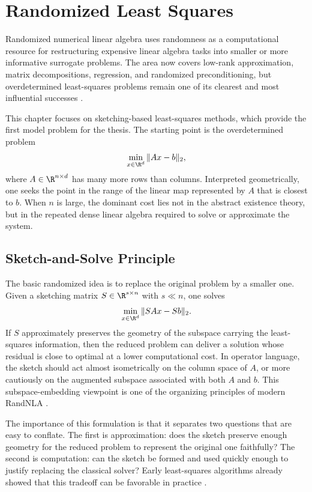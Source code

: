 \chapter{Randomized Least Squares} \label{ch:randls}

Randomized numerical linear algebra uses randomness as a computational resource for restructuring expensive linear algebra tasks into smaller or more informative surrogate problems. The area now covers low-rank approximation, matrix decompositions, regression, and randomized preconditioning, but overdetermined least-squares problems remain one of its clearest and most influential successes \cite{halko2011finding,martinsson2020randnla,woodruff2014sketching}.

This chapter focuses on sketching-based least-squares methods, which provide the
first model problem for the thesis. The starting point is the overdetermined problem
\[
	\min_{x \in \R^d} \|Ax-b\|_2,
\]
where \(A \in \R^{n \times d}\) has many more rows than columns. Interpreted geometrically, one seeks the point in the range of the linear map represented by \(A\) that is closest to \(b\). When \(n\) is large, the dominant cost lies not in the abstract existence theory, but in the repeated dense linear algebra required to solve or approximate the system.

\section{Sketch-and-Solve Principle}

The basic randomized idea is to replace the original problem by a smaller one. Given a sketching matrix \(S \in \R^{s \times n}\) with \(s \ll n\), one solves
\[
	\min_{x \in \R^d} \|SAx-Sb\|_2.
\]
If \(S\) approximately preserves the geometry of the subspace carrying the least-squares information, then the reduced problem can deliver a solution whose residual is close to optimal at a lower computational cost. In operator language, the sketch should act almost isometrically on the column space of \(A\), or more cautiously on the augmented subspace associated with both \(A\) and \(b\). This subspace-embedding viewpoint is one of the organizing principles of modern RandNLA \cite{woodruff2014sketching,martinsson2020randnla}.

The importance of this formulation is that it separates two questions that are easy to conflate. The first is approximation: does the sketch preserve enough geometry for the reduced problem to represent the original one faithfully? The second is computation: can the sketch be formed and used quickly enough to justify replacing the classical solver? Early least-squares algorithms already showed that this tradeoff can be favorable in practice \cite{rokhlin2008fastls,avron2010blendenpik}.

